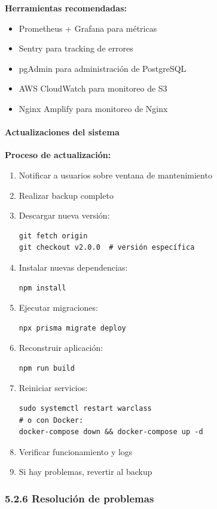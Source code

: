 \textbf{Herramientas recomendadas:}

\begin{itemize}
	\item Prometheus + Grafana para métricas
	\item Sentry para tracking de errores
	\item pgAdmin para administración de PostgreSQL
	\item AWS CloudWatch para monitoreo de S3
	\item Nginx Amplify para monitoreo de Nginx
\end{itemize}

\paragraph{Actualizaciones del sistema}

\textbf{Proceso de actualización:}

\begin{enumerate}
	\item Notificar a usuarios sobre ventana de mantenimiento
	\item Realizar backup completo
	\item Descargar nueva versión:
\begin{verbatim}
git fetch origin
git checkout v2.0.0  # versión específica
\end{verbatim}
	\item Instalar nuevas dependencias:
\begin{verbatim}
npm install
\end{verbatim}
	\item Ejecutar migraciones:
\begin{verbatim}
npx prisma migrate deploy
\end{verbatim}
	\item Reconstruir aplicación:
\begin{verbatim}
npm run build
\end{verbatim}
	\item Reiniciar servicios:
\begin{verbatim}
sudo systemctl restart warclass
# o con Docker:
docker-compose down && docker-compose up -d
\end{verbatim}
	\item Verificar funcionamiento y logs
	\item Si hay problemas, revertir al backup
\end{enumerate}

\subsubsection{5.2.6 Resolución de problemas}

